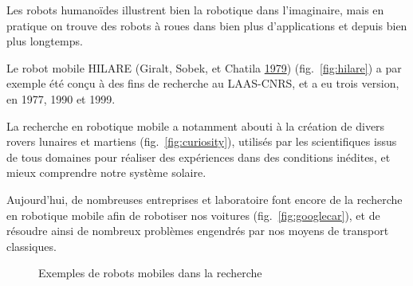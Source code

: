 \documentclass[french,A4paper,]{book}
\begin{document}
Les robots humanoïdes illustrent bien la robotique dans l'imaginaire,
mais en pratique on trouve des robots à roues dans bien plus
d'applications et depuis bien plus longtemps.

Le robot mobile HILARE (Giralt, Sobek, et Chatila
\protect\hyperlink{ref-giralt79}{1979}) (fig.~\ref{fig:hilare}) a par
exemple été conçu à des fins de recherche au LAAS-CNRS, et a eu trois
version, en 1977, 1990 et 1999.

La recherche en robotique mobile a notamment abouti à la création de
divers rovers lunaires et martiens (fig.~\ref{fig:curiosity}), utilisés
par les scientifiques issus de tous domaines pour réaliser des
expériences dans des conditions inédites, et mieux comprendre notre
système solaire.

Aujourd'hui, de nombreuses entreprises et laboratoire font encore de la
recherche en robotique mobile afin de robotiser nos voitures
(fig.~\ref{fig:googlecar}), et de résoudre ainsi de nombreux problèmes
engendrés par nos moyens de transport classiques.

\begin{figure}
\centering

\hspace*{\fill}
\hfill%
\hfill%
\hspace*{\fill}

\caption{Exemples de robots mobiles dans la recherche}

\label{fig:mobilerecherche}

\end{figure}
\end{document}
